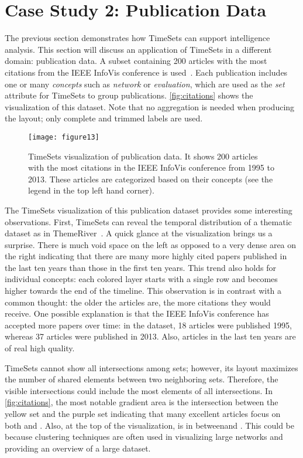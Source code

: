 \section{Case Study 2: Publication Data}
\label{sub:ts-pub}
The previous section demonstrates how TimeSets can support intelligence analysis. This section will discuss an application of TimeSets in a different domain: publication data. A subset containing 200 articles with the most citations from the IEEE InfoVis conference is used~\cite{Stasko2013}. Each publication includes one or many \emph{concepts} such as \emph{network} or \emph{evaluation}, which are used as the \emph{set} attribute for TimeSets to group publications. \autoref{fig:citations} shows the visualization of this dataset. Note that no aggregation is needed when producing the layout; only complete and trimmed labels are used.

\begin{figure}[!htb]
\centering
\texttt{[image: figure13]}
\caption[TimeSets visualization of publication data]{TimeSets visualization of publication data. It shows 200 articles with the most citations in the IEEE InfoVis conference from 1995 to 2013. These articles are categorized based on their concepts (see the legend in the top left hand corner).}
\label{fig:citations}
\end{figure}

The TimeSets visualization of this publication dataset provides some interesting observations. First, TimeSets can reveal the temporal distribution of a thematic dataset as in ThemeRiver~\cite{Havre2002}. A quick glance at the visualization brings us a surprise. There is much void space on the left as opposed to a very dense area on the right indicating that there are many more highly cited papers published in the last ten years than those in the first ten years. This trend also holds for individual concepts: each colored layer starts with a single row and becomes higher towards the end of the timeline. This observation is in contrast with a common thought: the older the articles are, the more citations they would receive. One possible explanation is that the IEEE InfoVis conference has accepted more papers over time: in the dataset, 18 articles were published 1995, whereas 37 articles were published in 2013. Also, articles in the last ten years are of real high quality.

TimeSets cannot show all intersections among sets; however,  its layout maximizes the number of shared elements between two neighboring sets. Therefore, the visible intersections could include the most elements of all intersections. In \autoref{fig:citations}, the most notable gradient area is the intersection between the yellow set and the purple set indicating that many excellent articles focus on both \tsevaluation{} and \tsinteraction. Also, at the top of the visualization, \tsclustering{} is in between\tsnetwork and \tsoverview{}. This could be because clustering techniques are often used in visualizing large networks and providing an overview of a large dataset.


